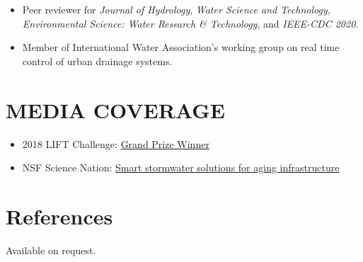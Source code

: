 \documentclass{my_cv}
\begin{document}
\begin{itemize}
	\item Peer reviewer for \textit{Journal of Hydrology}, \textit{Water Science and Technology}, \textit{Environmental Science: Water Research \& Technology}, and \textit{IEEE-CDC 2020}. 
	\item Member of International Water Association's working group on real time control of urban drainage systems.
\end{itemize}

\section*{MEDIA COVERAGE}
\begin{itemize}
	\item 2018 LIFT Challenge: \href{https://cee.engin.umich.edu/stories/joint-u-m-and-glwa-team-wins-inaugural-intelligent-water-challenge/}{Grand Prize Winner}
	\item NSF Science Nation: \href{https://www.youtube.com/watch?v=mStPThxAU08}{Smart stormwater solutions for aging infrastructure}
\end{itemize}

\section*{References}
Available on request. 
\end{document}
